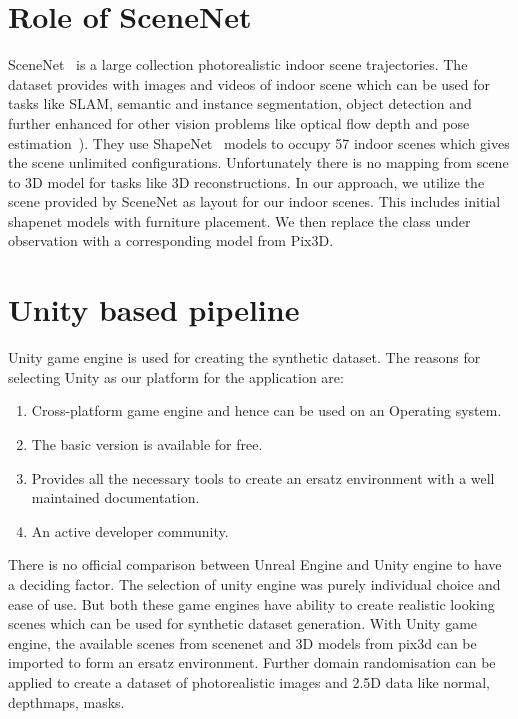 \section{Role of SceneNet}\label{sec:role-of-scenenet}
SceneNet~\cite{McCormac:etal:ICCV2017} is a large collection photorealistic indoor scene trajectories.
The dataset provides with images and videos of indoor scene which can be used for tasks like SLAM, semantic and instance segmentation,
object detection and further enhanced for other vision problems like optical flow depth and pose estimation~\cite{McCormac:etal:ICCV2017}).
They use ShapeNet~\cite{chang2015shapenet} models to occupy 57 indoor scenes which gives the scene unlimited configurations.
Unfortunately there is no mapping from scene to 3D model for tasks like 3D reconstructions.
In our approach, we utilize the scene provided by SceneNet as layout for our indoor scenes.
This includes initial shapenet models with furniture placement.
We then replace the class under observation with a corresponding model from Pix3D.

\section{Unity based pipeline}\label{sec:unity-based-pipeline}
Unity game engine is used for creating the synthetic dataset.
The reasons for selecting Unity as our platform for the application are:
\begin{enumerate}
    \item Cross-platform game engine and hence can be used on an Operating system.
    \item The basic version is available for free.
    \item Provides all the necessary tools to create an ersatz environment with a well maintained documentation.
    \item An active developer community.
\end{enumerate}

There is no official comparison between Unreal Engine and Unity engine to have a deciding factor.
The selection of unity engine was purely individual choice and ease of use.
But both these game engines have ability to create realistic looking scenes which can be used for synthetic dataset generation.
With Unity game engine, the available scenes from scenenet and 3D models from pix3d can be imported to form an ersatz environment.
Further domain randomisation can be applied to create a dataset of photorealistic images and 2.5D data like normal, depthmaps, masks.

